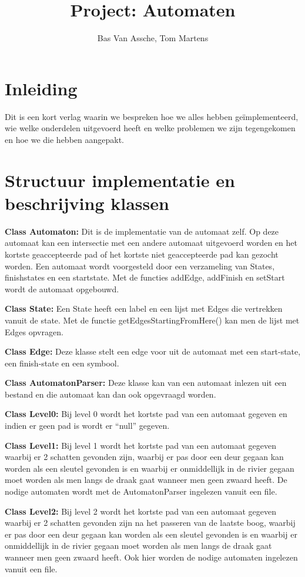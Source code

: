 \documentclass[a4paper, 11pt]{article}
\title{Project: Automaten}
\author{Bas Van Assche, Tom Martens}
\begin{document}
	\maketitle
	\tableofcontents
	\newpage
	\section{Inleiding}
		Dit is een kort verlag waarin we bespreken hoe we alles hebben geïmplementeerd, wie welke onderdelen uitgevoerd heeft en welke problemen we zijn tegengekomen en hoe we die hebben aangepakt.
	
	\section{Structuur implementatie en beschrijving klassen}
		\textbf{Class Automaton:}
		Dit is de implementatie van de automaat zelf. Op deze automaat kan een intersectie met een andere automaat uitgevoerd worden en het kortste geaccepteerde pad of het kortste niet geaccepteerde pad kan gezocht worden. Een automaat wordt voorgesteld door een verzameling van States, finishstates en een startstate. Met de functies addEdge, addFinish en setStart wordt de automaat opgebouwd.
		
		\textbf{Class State:}
		Een State heeft een label en een lijst met Edges die vertrekken vanuit de state. Met de functie getEdgesStartingFromHere() kan men de lijst met Edges opvragen.
		
		\textbf{Class Edge:}
		Deze klasse stelt een edge voor uit de automaat met een start-state, een finish-state en een symbool.
		
		\textbf{Class AutomatonParser:}
		Deze klasse kan van een automaat inlezen uit een bestand en die automaat kan dan ook opgevraagd worden.
		
		\textbf{Class Level0:}
		Bij level 0 wordt het kortste pad van een automaat gegeven en indien er geen pad is wordt er “null” gegeven.
		
		\textbf{Class Level1:}
		Bij level 1 wordt het kortste pad van een automaat gegeven waarbij er 2 schatten gevonden zijn, waarbij er pas door een deur gegaan kan worden als een sleutel gevonden is en waarbij er onmiddellijk in de rivier gegaan moet worden als men langs de draak gaat wanneer men geen zwaard heeft.
		De nodige automaten wordt met de AutomatonParser ingelezen vanuit een file.
		
		\textbf{Class Level2:}
		Bij level 2 wordt het kortste pad van een automaat gegeven waarbij er 2 schatten gevonden zijn na het passeren van de laatste boog, waarbij er pas door een deur gegaan kan worden als een sleutel gevonden is en waarbij er onmiddellijk in de rivier gegaan moet worden als men langs de draak gaat wanneer men geen zwaard heeft.
		Ook hier worden de nodige automaten ingelezen vanuit een file.
		
\end{document}

